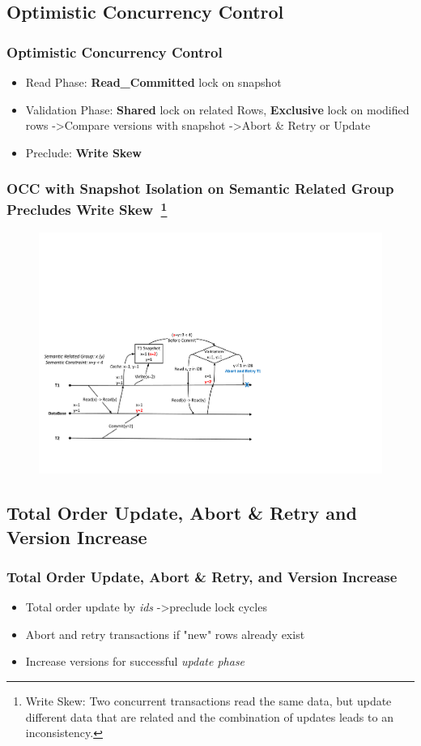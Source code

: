 \documentclass{beamer}
\begin{document}
\subsection{Optimistic Concurrency Control}
\begin{frame}
	\frametitle{Optimistic Concurrency Control}
	\begin{itemize}
		\item Read Phase: \textbf{Read\_Committed} lock on snapshot
		\item Validation Phase: \textbf{Shared} lock on related Rows, \textbf{Exclusive} lock on modified rows -\textgreater Compare versions with snapshot -\textgreater Abort \& Retry or Update
		\item Preclude: \textbf{Write Skew}
	\end{itemize}
\end{frame}
\begin{frame}
	\frametitle{OCC with Snapshot Isolation on Semantic Related Group Precludes \textbf{Write Skew}~\footnote{Write Skew: Two concurrent transactions read the same data, but update different data that are related and the combination of updates leads to an inconsistency.}}
	\begin{figure}[h]
		\centering
		\includegraphics[width=\linewidth]{figs/snapwriteskew.pdf}
	\end{figure}
\end{frame}

\subsection{Total Order Update, Abort \& Retry and Version Increase}
\begin{frame}
	\frametitle{Total Order Update, Abort \& Retry, and Version Increase}
	\begin{itemize}
		\item Total order update by \textit{ids} -\textgreater preclude lock cycles
		\item Abort and retry transactions if "new" rows already exist
		\item Increase versions for successful \textit{update phase}
	\end{itemize}
\end{frame}
\end{document}
